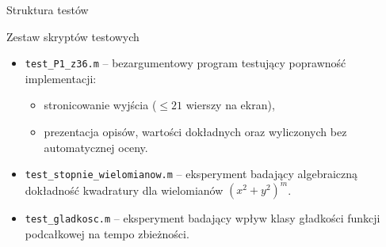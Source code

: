 \documentclass[aspectratio=169, 10pt, xcolor={table}]{beamer}
\begin{document}
\begin{frame}{Struktura testów}
      \begin{block}{Zestaw skryptów testowych}
        \begin{itemize}
          \item \texttt{test\_P1\_z36.m} -- bezargumentowy program testujący poprawność implementacji:
          \begin{itemize}
            \item stronicowanie wyjścia ($\le 21$ wierszy na ekran),
            \item prezentacja opisów, wartości dokładnych oraz wyliczonych bez automatycznej oceny.
          \end{itemize}
          \item \texttt{test\_stopnie\_wielomianow.m} -- eksperyment badający algebraiczną dokładność kwadratury dla wielomianów $(x^2+y^2)^m$.
          \item \texttt{test\_gladkosc.m} -- eksperyment badający wpływ klasy gładkości funkcji podcałkowej na tempo zbieżności.
        \end{itemize}
      \end{block}

\end{frame}
\end{document}

